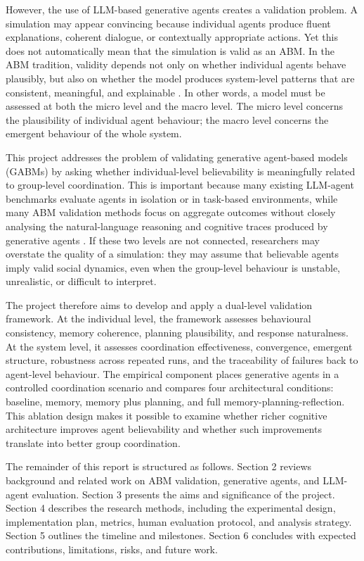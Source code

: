 \documentclass[11pt]{article}
\begin{document}
However, the use of LLM-based generative agents creates a validation problem. A simulation may appear convincing because individual agents produce fluent explanations, coherent dialogue, or contextually appropriate actions. Yet this does not automatically mean that the simulation is valid as an ABM. In the ABM tradition, validity depends not only on whether individual agents behave plausibly, but also on whether the model produces system-level patterns that are consistent, meaningful, and explainable \cite{windrum2007empirical, moss2005towards}. In other words, a model must be assessed at both the micro level and the macro level. The micro level concerns the plausibility of individual agent behaviour; the macro level concerns the emergent behaviour of the whole system.

This project addresses the problem of validating generative agent-based models (GABMs) by asking whether individual-level believability is meaningfully related to group-level coordination. This is important because many existing LLM-agent benchmarks evaluate agents in isolation or in task-based environments, while many ABM validation methods focus on aggregate outcomes without closely analysing the natural-language reasoning and cognitive traces produced by generative agents \cite{li2024agentbench, mohammadi2025evaluation, sen2025validating}. If these two levels are not connected, researchers may overstate the quality of a simulation: they may assume that believable agents imply valid social dynamics, even when the group-level behaviour is unstable, unrealistic, or difficult to interpret.

The project therefore aims to develop and apply a dual-level validation framework. At the individual level, the framework assesses behavioural consistency, memory coherence, planning plausibility, and response naturalness. At the system level, it assesses coordination effectiveness, convergence, emergent structure, robustness across repeated runs, and the traceability of failures back to agent-level behaviour. The empirical component places generative agents in a controlled coordination scenario and compares four architectural conditions: baseline, memory, memory plus planning, and full memory-planning-reflection. This ablation design makes it possible to examine whether richer cognitive architecture improves agent believability and whether such improvements translate into better group coordination.

The remainder of this report is structured as follows. Section 2 reviews background and related work on ABM validation, generative agents, and LLM-agent evaluation. Section 3 presents the aims and significance of the project. Section 4 describes the research methods, including the experimental design, implementation plan, metrics, human evaluation protocol, and analysis strategy. Section 5 outlines the timeline and milestones. Section 6 concludes with expected contributions, limitations, risks, and future work.
\end{document}
